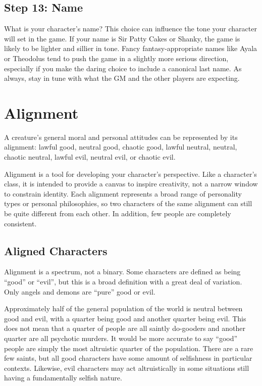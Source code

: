     \subsection{Step 13: Name}
        What is your character's name?
        This choice can influence the tone your character will set in the game.
        If your name is Sir Patty Cakes or Shanky, the game is likely to be lighter and sillier in tone.
        Fancy fantasy-appropriate names like Ayala or Theodolus tend to push the game in a slightly more serious direction, especially if you make the daring choice to include a canonical last name.
        As always, stay in tune with what the GM and the other players are expecting.

\section{Alignment}\label{Alignment}
    A creature's general moral and personal attitudes can be represented by its alignment: lawful good, neutral good, chaotic good, lawful neutral, neutral, chaotic neutral, lawful evil, neutral evil, or chaotic evil.

    Alignment is a tool for developing your character's perspective.
    Like a character's class, it is intended to provide a canvas to inspire creativity, not a narrow window to constrain identity.
    Each alignment represents a broad range of personality types or personal philosophies, so two characters of the same alignment can still be quite different from each other.
    In addition, few people are completely consistent.

    \subsection{Aligned Characters}
        Alignment is a spectrum, not a binary.
        Some characters are defined as being ``good'' or ``evil'', but this is a broad definition with a great deal of variation.
        Only angels and demons are ``pure'' good or evil.

        Approximately half of the general population of the world is neutral between good and evil, with a quarter being good and another quarter being evil.
        This does not mean that a quarter of people are all saintly do-gooders and another quarter are all psychotic murders.
        It would be more accurate to say ``good'' people are simply the most altruistic quarter of the population.
        There are a rare few saints, but all good characters have some amount of selfishness in particular contexts.
        Likewise, evil characters may act altruistically in some situations still having a fundamentally selfish nature.

